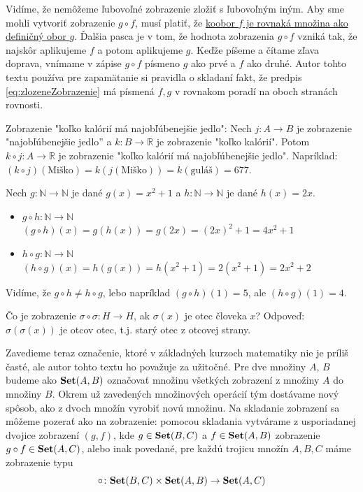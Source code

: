 Vidíme, že nemôžeme ľubovoľné zobrazenie zložiť s ľubovoľným iným. Aby sme mohli vytvoriť zobrazenie $g\circ f$, musí
platiť, že \ul{koobor $f$ je rovnaká množina ako definičný obor $g$}. Ďalšia pasca je v tom, že hodnota
zobrazenia $g\circ f$ vzniká tak, že najskôr aplikujeme $f$ a potom aplikujeme $g$. Keďže píšeme a čítame zľava doprava,
vnímame v zápise $g\circ f$ písmeno $g$ ako prvé a $f$ ako druhé. Autor tohto textu používa pre zapamätanie si pravidla
o skladaní fakt, že predpis \eqref{eq:zlozeneZobrazenie} má písmená $f,g$ v rovnakom poradí na oboch stranách rovnosti.

\begin{example}
Zobrazenie "koľko kalórií má najobľúbenejšie jedlo":
Nech $j \colon A \rightarrow B$ je zobrazenie "najobľúbenejšie jedlo'' {a} $k \colon B \rightarrow \mathbb{R}$ je zobrazenie "koľko kalórií".
Potom $k \circ j \colon A \rightarrow \mathbb{R}$ je zobrazenie "koľko kalórií má najobľúbenejšie jedlo".
Napríklad: $(k \circ j)(\text{Miško}) = k(j(\text{Miško})) = k(\text{guláš}) = 677$.
\end{example}

\begin{example}
Nech $g \colon \mathbb{N} \rightarrow \mathbb{N}$ je dané $g(x) = x^2+1$ a $h \colon \mathbb{N} \rightarrow \mathbb{N}$ je dané $h(x) = 2x$.
\begin{itemize}
    \item $g \circ h \colon \mathbb{N} \rightarrow \mathbb{N}$ \\
    $(g \circ h)(x) = g(h(x)) = g(2x) = (2x)^2+1 = 4x^2+1$
    \item $h \circ g \colon \mathbb{N} \rightarrow \mathbb{N}$ \\
    $(h \circ g)(x) = h(g(x)) = h(x^2+1) = 2(x^2+1) = 2x^2+2$
\end{itemize}
Vidíme, že $g \circ h \neq h \circ g$, lebo napríklad $(g \circ h)(1) = 5$, ale $(h \circ g)(1) = 4$.
\end{example}

\begin{example}
Čo je zobrazenie $\sigma \circ \sigma \colon H \rightarrow H$, ak $\sigma(x)$ je otec človeka $x$?
Odpoveď: $\sigma(\sigma(x))$ je otcov otec, t.j. starý otec z otcovej strany.
\end{example}

Zavedieme teraz označenie, ktoré v základných kurzoch matematiky nie je príliš časté, ale autor tohto textu ho považuje za
užitočné. Pre dve množiny $A$, $B$ budeme ako $\mathbf{Set}(A,B)$ označovať množinu všetkých zobrazení
z množiny $A$ do množiny $B$. Okrem už zavedených množinových operácií tým dostávame nový spôsob, ako z dvoch množín
vyrobiť novú množinu. Na skladanie zobrazení sa môžeme pozerať ako na zobrazenie: pomocou skladania
vytvárame z usporiadanej dvojice zobrazení $(g,f)$, kde $g\in\mathbf{Set}(B,C)$ a $f\in\mathbf{Set}(A,B)$ zobrazenie
$g\circ f\in\mathbf{Set}(A,C)$, alebo inak povedané, pre každú trojicu množín $A,B,C$ máme zobrazenie typu
\[
\circ\colon\mathbf{Set}(B,C)\times\mathbf{Set}(A,B)\to\mathbf{Set}(A,C)
\]

